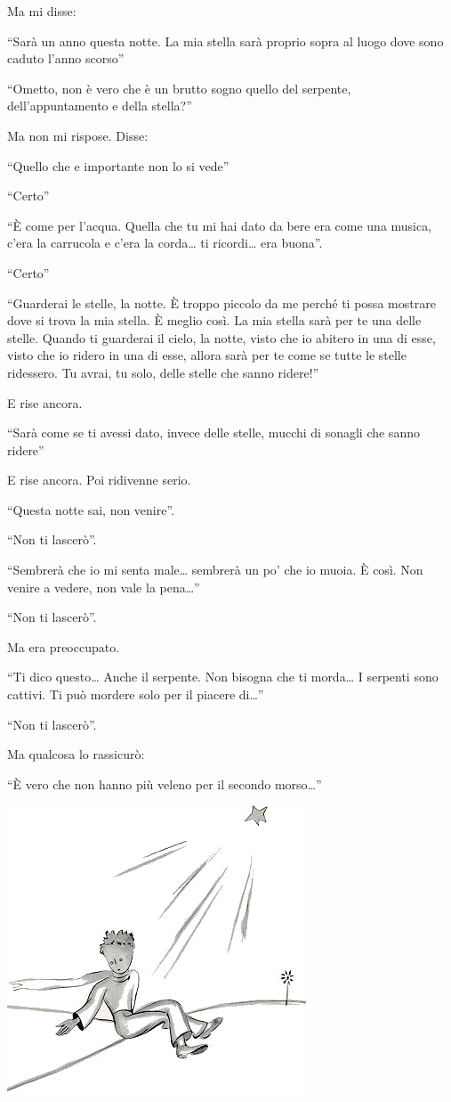 \documentclass[11pt]{scrbook}
\begin{document}
Ma mi disse:

``Sarà un anno questa notte. La mia stella sarà proprio sopra al luogo
dove sono caduto l'anno scorso''

``Ometto, non è vero che è un brutto sogno quello del serpente,
dell'appuntamento e della stella?''

Ma non mi rispose. Disse:

``Quello che e importante non lo si vede''

``Certo''

``È come per l'acqua. Quella che tu mi hai dato da bere era come una
musica, c'era la carrucola e c'era la corda\ldots{} ti ricordi\ldots{}
era buona''.

``Certo''

``Guarderai le stelle, la notte. È troppo piccolo da me perché ti possa
mostrare dove si trova la mia stella. È meglio così. La mia stella sarà
per te una delle stelle. Quando ti guarderai il cielo, la notte, visto
che io abitero in una di esse, visto che io ridero in una di esse,
allora sarà per te come se tutte le stelle ridessero. Tu avrai, tu solo,
delle stelle che sanno ridere!''

E rise ancora.

``Sarà come se ti avessi dato, invece delle stelle, mucchi di sonagli che sanno ridere''

E rise ancora. Poi ridivenne serio.

``Questa notte sai, non venire''.

``Non ti lascerò''.

``Sembrerà che io mi senta male\ldots{} sembrerà un po' che io muoia. È così. Non venire a vedere, non vale la pena\ldots{}''

``Non ti lascerò''.

Ma era preoccupato.

``Ti dico questo\ldots{} Anche il serpente. Non bisogna che ti morda\ldots{} I serpenti sono cattivi. Ti può mordere solo per il piacere di\ldots{}''

``Non ti lascerò''.

Ma qualcosa lo rassicurò:

``È vero che non hanno più veleno per il secondo morso\ldots{}''

\begin{center}
\includegraphics{img/26b}
\end{center}
\end{document}
